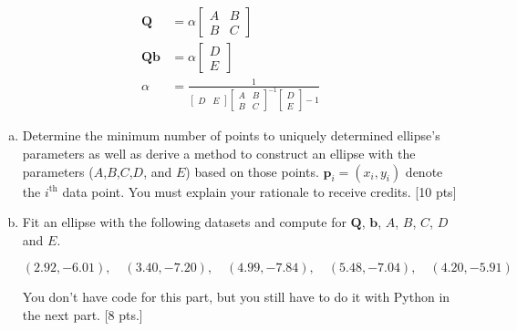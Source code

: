 \begin{equation*}
    \begin{aligned}
        \mathbf{Q}&=\alpha\begin{bmatrix}
        A & B\\ B & C
    \end{bmatrix}\\
    \mathbf{Q}\mathbf{b}&=\alpha\begin{bmatrix}
        D\\E
    \end{bmatrix}\\
    \alpha&=\frac{1}{\begin{bmatrix}
        D & E
    \end{bmatrix}\begin{bmatrix}
        A & B \\ B & C
    \end{bmatrix}^{-1}\begin{bmatrix}
        D \\ E
    \end{bmatrix}-1}
    \end{aligned}
\end{equation*}

\begin{enumerate}[a.)]  
\item Determine the minimum number of points to uniquely determined ellipse's parameters as well as derive a method to construct an ellipse with the parameters ($A$,$B$,$C$,$D$, and $E$) based on those points. $\mathbf{p}_i=(x_i,y_i)$ denote the $i^\text{th}$ data point. You must explain your rationale to receive credits. [10 pts]
\item 
Fit an ellipse with the following datasets and compute for $\mathbf{Q}$, $\mathbf{b}$, $A$, $B$, $C$, $D$ and $E$.

\begin{equation*}
    (2.92, -6.01), \quad (3.40, -7.20), \quad (4.99, -7.84), \quad (5.48, -7.04), \quad (4.20, -5.91)
\end{equation*}

 You don't have code for this part, but you still have to do it with Python in the next part. [8 pts.]
\end{enumerate}
